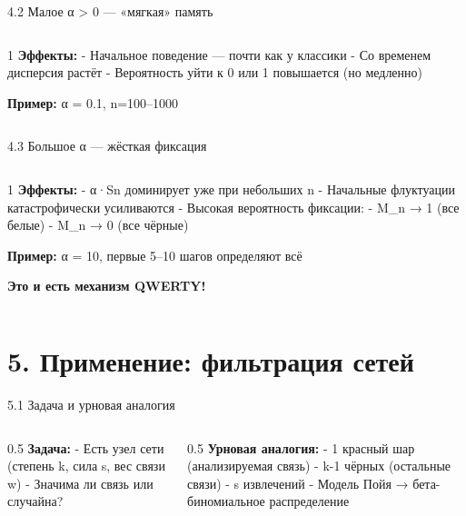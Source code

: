 \documentclass[
  ignorenonframetext,
  aspectratio=169,
  russian,
]{beamer}
\begin{document}
\begin{frame}{4.2 Малое α \textgreater{} 0 --- «мягкая» память}
\label{ux43cux430ux43bux43eux435-ux3b1-0-ux43cux44fux433ux43aux430ux44f-ux43fux430ux43cux44fux442ux44c}
\begin{columns}[T]
\begin{column}{1\linewidth}
\textbf{Эффекты:} - Начальное поведение --- почти как у классики - Со
временем дисперсия растёт - Вероятность уйти к 0 или 1 повышается (но
медленно)

\textbf{Пример:} α = 0.1, n=100--1000
\end{column}
\end{columns}
\end{frame}

\begin{frame}{4.3 Большое α --- жёсткая фиксация}
\label{ux431ux43eux43bux44cux448ux43eux435-ux3b1-ux436ux451ux441ux442ux43aux430ux44f-ux444ux438ux43aux441ux430ux446ux438ux44f}
\begin{columns}[T]
\begin{column}{1\linewidth}
\textbf{Эффекты:} - α·Sn доминирует уже при небольших n - Начальные
флуктуации катастрофически усиливаются - Высокая вероятность фиксации: -
M\_n → 1 (все белые) - M\_n → 0 (все чёрные)

\textbf{Пример:} α = 10, первые 5--10 шагов определяют всё

\textbf{Это и есть механизм QWERTY!}
\end{column}
\end{columns}
\end{frame}

\section{5. Применение: фильтрация
сетей}\label{ux43fux440ux438ux43cux435ux43dux435ux43dux438ux435-ux444ux438ux43bux44cux442ux440ux430ux446ux438ux44f-ux441ux435ux442ux435ux439}

\begin{frame}{5.1 Задача и урновая аналогия}
\label{ux437ux430ux434ux430ux447ux430-ux438-ux443ux440ux43dux43eux432ux430ux44f-ux430ux43dux430ux43bux43eux433ux438ux44f}
\begin{columns}[T]
\begin{column}{0.5\linewidth}
\textbf{Задача:} - Есть узел сети (степень k, сила s, вес связи w) -
Значима ли связь или случайна?
\end{column}

\begin{column}{0.5\linewidth}
\textbf{Урновая аналогия:} - 1 красный шар (анализируемая связь) - k-1
чёрных (остальные связи) - s извлечений - Модель Пойя →
бета-биномиальное распределение
\end{column}
\end{columns}
\end{frame}
\end{document}
